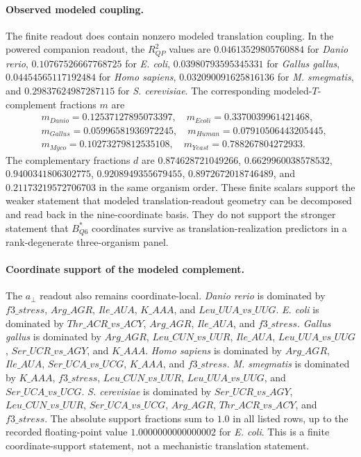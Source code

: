 \paragraph{Observed modeled coupling.}
The finite readout does contain nonzero modeled translation coupling.  In the powered companion readout, the $R^2_{QP}$ values are $0.04613529805760884$ for \emph{Danio rerio}, $0.10767526667768725$ for \emph{E. coli}, $0.03980793595345331$ for \emph{Gallus gallus}, $0.04454565117192484$ for \emph{Homo sapiens}, $0.032090091625816136$ for \emph{M. smegmatis}, and $0.29837624987287115$ for \emph{S. cerevisiae}.  The corresponding modeled-$T$-complement fractions $m$ are
$$
\begin{aligned}
&m_{Danio}=0.12537127895073397,\quad m_{Ecoli}=0.3370039961421468,\\
&m_{Gallus}=0.05996581936972245,\quad m_{Human}=0.07910506443205445,\\
&m_{Myco}=0.10273279812535108,\quad m_{Yeast}=0.788267804272933.
\end{aligned}
$$
The complementary fractions $d$ are $0.874628721049266$, $0.6629960038578532$, $0.9400341806302775$, $0.9208949355679455$, $0.8972672018746489$, and $0.21173219572706703$ in the same organism order.  These finite scalars support the weaker statement that modeled translation-readout geometry can be decomposed and read back in the nine-coordinate basis.  They do not support the stronger statement that $B^*_{Q6}$ coordinates survive as translation-realization predictors in a rank-degenerate three-organism panel.

\paragraph{Coordinate support of the modeled complement.}
The $a_{\perp}$ readout also remains coordinate-local.  \emph{Danio rerio} is dominated by $f3\_stress$, $Arg\_AGR$, $Ile\_AUA$, $K\_AAA$, and $Leu\_UUA\_vs\_UUG$.  \emph{E. coli} is dominated by $Thr\_ACR\_vs\_ACY$, $Arg\_AGR$, $Ile\_AUA$, and $f3\_stress$.  \emph{Gallus gallus} is dominated by $Arg\_AGR$, $Leu\_CUN\_vs\_UUR$, $Ile\_AUA$, $Leu\_UUA\_vs\_UUG$, $Ser\_UCR\_vs\_AGY$, and $K\_AAA$.  \emph{Homo sapiens} is dominated by $Arg\_AGR$, $Ile\_AUA$, $Ser\_UCA\_vs\_UCG$, $K\_AAA$, and $f3\_stress$.  \emph{M. smegmatis} is dominated by $K\_AAA$, $f3\_stress$, $Leu\_CUN\_vs\_UUR$, $Leu\_UUA\_vs\_UUG$, and $Ser\_UCA\_vs\_UCG$.  \emph{S. cerevisiae} is dominated by $Ser\_UCR\_vs\_AGY$, $Leu\_CUN\_vs\_UUR$, $Ser\_UCA\_vs\_UCG$, $Arg\_AGR$, $Thr\_ACR\_vs\_ACY$, and $f3\_stress$.  The absolute support fractions sum to $1.0$ in all listed rows, up to the recorded floating-point value $1.0000000000000002$ for \emph{E. coli}.  This is a finite coordinate-support statement, not a mechanistic translation statement.

